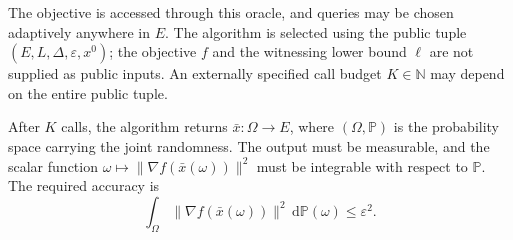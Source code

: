 \documentclass[10pt]{article}
\theoremstyle{definition}
\begin{document}
The objective is accessed through this oracle, and queries may be chosen adaptively anywhere in $E$. The algorithm is selected using the public tuple $(E,L,\Delta,\varepsilon,x^0)$; the objective $f$ and the witnessing lower bound $\ell$ are not supplied as public inputs. An externally specified call budget $K\in\mathbb{N}$ may depend on the entire public tuple.

After $K$ calls, the algorithm returns $\bar{x}:\Omega\to E$, where $(\Omega,\mathbb{P})$ is the probability space carrying the joint randomness. The output must be measurable, and the scalar function $\omega\mapsto\|\nabla f(\bar{x}(\omega))\|^2$ must be integrable with respect to $\mathbb{P}$. The required accuracy is
\begin{equation}
\label{eq:accuracy}
\int_{\Omega}\|\nabla f(\bar{x}(\omega))\|^2\,\mathrm{d}\mathbb{P}(\omega)
\leq\varepsilon^2.
\end{equation}
\end{document}
